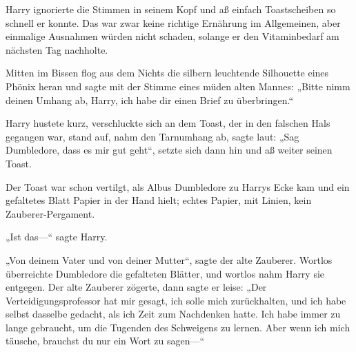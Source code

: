 Harry ignorierte die Stimmen in seinem Kopf und aß einfach Toastscheiben so schnell er konnte. Das war zwar keine richtige Ernährung im Allgemeinen, aber einmalige Ausnahmen würden nicht schaden, solange er den Vitaminbedarf am nächsten Tag nachholte.

Mitten im Bissen flog aus dem Nichts die silbern leuchtende Silhouette eines Phönix heran und sagte mit der Stimme eines müden alten Mannes: „Bitte nimm deinen Umhang ab, Harry, ich habe dir einen Brief zu überbringen.“

Harry hustete kurz, verschluckte sich an dem Toast, der in den falschen Hals gegangen war, stand auf, nahm den Tarnumhang ab, sagte laut: „Sag Dumbledore, dass es mir gut geht“, setzte sich dann hin und aß weiter seinen Toast.

Der Toast war schon vertilgt, als Albus Dumbledore zu Harrys Ecke kam und ein gefaltetes Blatt Papier in der Hand hielt; echtes Papier, mit Linien, kein Zauberer-Pergament.

„Ist das—“ sagte Harry.

„Von deinem Vater und von deiner Mutter“, sagte der alte Zauberer. Wortlos überreichte Dumbledore die gefalteten Blätter, und wortlos nahm Harry sie entgegen. Der alte Zauberer zögerte, dann sagte er leise: „Der Verteidigungsprofessor hat mir gesagt, ich solle mich zurückhalten, und ich habe selbst dasselbe gedacht, als ich Zeit zum Nachdenken hatte. Ich habe immer zu lange gebraucht, um die Tugenden des Schweigens zu lernen. Aber wenn ich mich täusche, brauchst du nur ein Wort zu sagen—“

